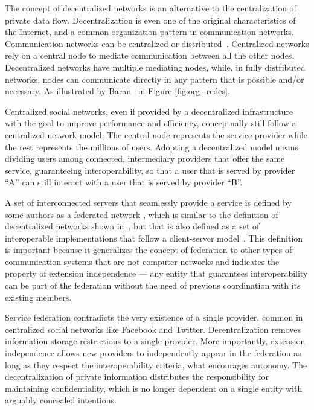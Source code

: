 The concept of decentralized networks is an alternative to the centralization
of private data flow. Decentralization is even one of the original
characteristics of the Internet, and a common organization pattern in
communication networks. Communication networks can be centralized or
distributed~\cite{baran1964}. Centralized networks rely on a central node to
mediate communication between all the other nodes.  Decentralized networks have
multiple mediating nodes, while, in fully distributed networks, nodes can
communicate directly in any pattern that is possible and/or necessary. As
illustrated by Baran~\cite{baran1964} in Figure \ref{fig:org_redes}.

Centralized social networks, even if provided by a decentralized
infrastructure with the goal to improve performance and efficiency,
conceptually still follow a centralized network model. The central node
represents the service provider while the rest represents the millions
of users. Adopting a decentralized model means dividing users among
connected, intermediary providers that offer the same service,
guaranteeing interoperability, so that a user that is served by provider
``A'' can still interact with a user that is served by provider ``B''.

A set of interconnected servers that seamlessly provide a service is defined by
some authors as a federated network \cite{fednetworks}, which is similar to the
definition of decentralized networks shown in~\cite{baran1964}, but that is also
defined as a set of interoperable implementations that follow a client-server
model~\cite{barocas2012}.  This definition is important because it generalizes
the concept of federation to other types of communication systems that are
not computer networks and indicates the property of extension independence --- any
entity that guarantees interoperability can be part of the federation without
the need of previous coordination with its existing members.

Service federation contradicts the very existence of a single provider,
common in centralized social networks like Facebook and Twitter.
Decentralization removes information storage restrictions to a single
provider. More importantly, extension independence allows new providers
to independently appear in the federation as long as they respect the
interoperability criteria, what encourages autonomy. The decentralization
of private information distributes the responsibility for maintaining
confidentiality, which is no longer dependent on a single entity with arguably
concealed intentions.


